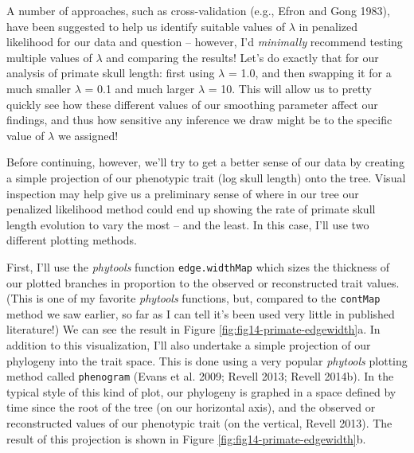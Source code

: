 \documentclass[fleqn,10pt,lineno]{wlpeerj} %
\begin{document}
A number of approaches, such as cross-validation (e.g., Efron and Gong 1983), have been suggested to help us identify suitable values of \(\lambda\) in penalized likelihood for our data and question -- however, I'd \emph{minimally} recommend testing multiple values of \(\lambda\) and comparing the results! Let's do exactly that for our analysis of primate skull length: first using \(\lambda\) = 1.0, and then swapping it for a much smaller \(\lambda\) = 0.1 and much larger \(\lambda\) = 10. This will allow us to pretty quickly see how these different values of our smoothing parameter affect our findings, and thus how sensitive any inference we draw might be to the specific value of \(\lambda\) we assigned!

Before continuing, however, we'll try to get a better sense of our data by creating a simple projection of our phenotypic trait (log skull length) onto the tree. Visual inspection may help give us a preliminary sense of where in our tree our penalized likelihood method could end up showing the rate of primate skull length evolution to vary the most -- and the least. In this case, I'll use two different plotting methods.

First, I'll use the \emph{phytools} function \texttt{edge.widthMap} which sizes the thickness of our plotted branches in proportion to the observed or reconstructed trait values. (This is one of my favorite \emph{phytools} functions, but, compared to the \texttt{contMap} method we saw earlier, so far as I can tell it's been used very little in published literature!) We can see the result in Figure \ref{fig:fig14-primate-edgewidth}a. In addition to this visualization, I'll also undertake a simple projection of our phylogeny into the trait space. This is done using a very popular \emph{phytools} plotting method called \texttt{phenogram} (Evans et al. 2009; Revell 2013; Revell 2014b). In the typical style of this kind of plot, our phylogeny is graphed in a space defined by time since the root of the tree (on our horizontal axis), and the observed or reconstructed values of our phenotypic trait (on the vertical, Revell 2013). The result of this projection is shown in Figure \ref{fig:fig14-primate-edgewidth}b.
\end{document}
